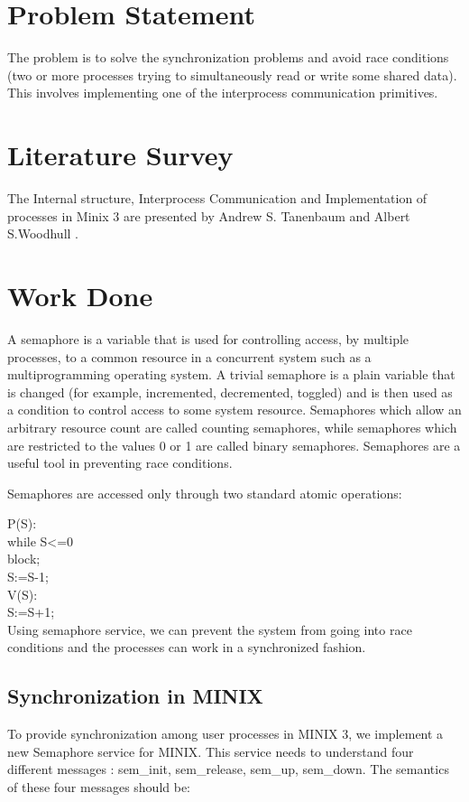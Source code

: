 \documentclass[a4paper,11pt,twocolumn]{article}
\begin{document}
\section{Problem Statement}
The problem is to solve the synchronization problems and avoid race conditions (two or more processes trying to simultaneously read or write some shared data). This involves implementing one of the interprocess communication primitives.
\section{Literature Survey }
The Internal structure, Interprocess Communication and Implementation of processes in Minix 3 are presented by Andrew S. Tanenbaum and Albert S.Woodhull \cite{much}.
\section{Work Done}
A semaphore is a variable that is used for controlling access, by multiple processes, to a common resource in a concurrent system such as a multiprogramming operating system. A trivial semaphore is a plain variable that is changed (for example, incremented, decremented, toggled)  and is then used as a condition to control access to some system resource. Semaphores which allow an arbitrary resource count are called counting semaphores, while semaphores which are restricted to the values 0 or 1 are called binary semaphores. Semaphores are a useful tool in preventing race conditions.

Semaphores are accessed only through two standard atomic operations:

	P(S):\\
		while S\textless=0\\
		block;\\
		S:=S-1;\\
	V(S):\\
		S:=S+1;\\
Using semaphore service, we can prevent the system from going into race conditions and the processes can work in a synchronized fashion.

\subsection{Synchronization in MINIX}
To provide synchronization among user processes in MINIX 3, we implement a new Semaphore service for MINIX. This service needs to understand four different messages : sem\_init, sem\_release, sem\_up, sem\_down. The semantics of these four messages should be:
\end{document}

